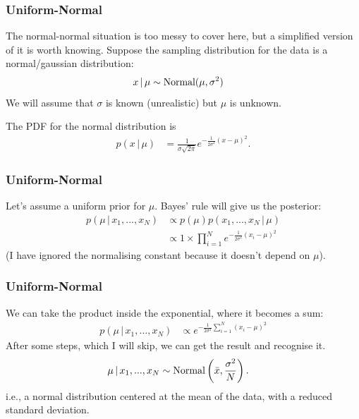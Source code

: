\documentclass{beamer}
\newcommand{\given}{\,|\,}
\begin{document}
\begin{frame}
\frametitle{Uniform-Normal}
The normal-normal situation is too messy to cover here, but a simplified version
of it is worth knowing. Suppose the sampling distribution for the data is
a normal/gaussian distribution:
\begin{align}
x \given \mu &\sim \textnormal{Normal}(\mu, \sigma^2)
\end{align}
\pause
We will assume that $\sigma$ is known (unrealistic) but $\mu$ is unknown.\pause

The PDF for the normal distribution is
\begin{align}
p(x \given \mu) &= \frac{1}{\sigma\sqrt{2\pi}}e^{-\frac{1}{2\sigma^2}(x-\mu)^2}.
\end{align}

\end{frame}


\begin{frame}
\frametitle{Uniform-Normal}
Let's assume a uniform prior for $\mu$.
Bayes' rule will give us the posterior:
\begin{align}
p(\mu \given x_1, ..., x_N) &\propto p(\mu)p(x_1, ..., x_N \given \mu) \\
    &\propto 1 \times \prod_{i=1}^N e^{-\frac{1}{2\sigma^2}(x_i - \mu)^2}
\end{align}
(I have ignored the normalising constant because it doesn't depend on $\mu$).

\end{frame}

\begin{frame}
\frametitle{Uniform-Normal}
We can take the product inside the exponential, where it becomes a sum:
\begin{align}
p(\mu \given x_1, ..., x_N) &\propto
    e^{-\frac{1}{2\sigma^2}\sum_{i=1}^N(x_i - \mu)^2}
\end{align}
\pause
After some steps, which I will skip, we can get the result and recognise it.
\begin{align}
\mu \given x_1, ..., x_N &\sim \textnormal{Normal}\left(\bar{x}, \frac{\sigma^2}{N}\right).
\end{align}
\pause
i.e., a normal distribution centered at the mean of the data, with a reduced
standard deviation.



\end{frame}
\end{document}
